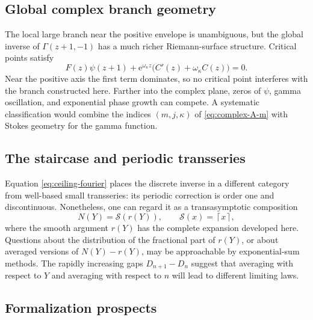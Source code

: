 \documentclass[11pt]{article}
\numberwithin{equation}{section}
\theoremstyle{mainthm}
\theoremstyle{defstyle}
\theoremstyle{remark}
\newcommand{\e}{\mathrm e}
\newcommand{\ceil}[1]{\left\lceil #1\right\rceil}
\begin{document}
\subsection{Global complex branch geometry}

The local large branch near the positive envelope is unambiguous, but the global inverse of \(\Gamma(z+1,-1)\) has a much richer Riemann-surface structure.  Critical points satisfy
\begin{equation}\label{eq:critical-subfactorial}
 F(z)\psi(z+1)+\e^{\omega_\kappa z}\bigl(C'(z)+\omega_\kappa C(z)\bigr)=0.
\end{equation}
Near the positive axis the first term dominates, so no critical point interferes with the branch constructed here.  Farther into the complex plane, zeros of \(\psi\), gamma oscillation, and exponential phase growth can compete.  A systematic classification would combine the indices \((m,j,\kappa)\) of \cref{eq:complex-A-m} with Stokes geometry for the gamma function.

\subsection{The staircase and periodic transseries}

Equation \cref{eq:ceiling-fourier} places the discrete inverse in a different category from well-based small transseries: its periodic correction is order one and discontinuous.  Nonetheless, one can regard it as a transasymptotic composition
\[
 N(Y)=\mathcal S(r(Y)),
 \qquad \mathcal S(x)=\ceil{x},
\]
where the smooth argument \(r(Y)\) has the complete expansion developed here.  Questions about the distribution of the fractional part of \(r(Y)\), or about averaged versions of \(N(Y)-r(Y)\), may be approachable by exponential-sum methods.  The rapidly increasing gaps \(D_{n+1}-D_n\) suggest that averaging with respect to \(Y\) and averaging with respect to \(n\) will lead to different limiting laws.

\subsection{Formalization prospects}
\end{document}

